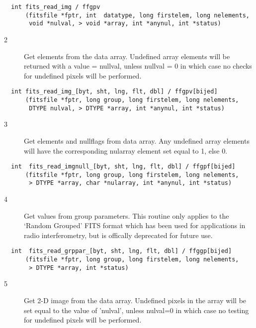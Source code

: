 \begin{verbatim}
  int fits_read_img / ffgpv
      (fitsfile *fptr, int  datatype, long firstelem, long nelements,
       void *nulval, > void *array, int *anynul, int *status)
\end{verbatim}

\begin{description}
\item[2 ] Get elements from the data array.  Undefined array elements will be
    returned with a value = nullval, unless nullval = 0 in which case no
   checks for undefined pixels will be performed.
\end{description}

\begin{verbatim}
  int fits_read_img_[byt, sht, lng, flt, dbl] / ffgpv[bijed]
      (fitsfile *fptr, long group, long firstelem, long nelements,
       DTYPE nulval, > DTYPE *array, int *anynul, int *status)
\end{verbatim}

\begin{description}
\item[3 ] Get elements and nullflags from data array.
    Any undefined array elements will have the corresponding nularray element
   set equal to 1, else 0.
\end{description}

\begin{verbatim}
  int  fits_read_imgnull_[byt, sht, lng, flt, dbl] / ffgpf[bijed]
      (fitsfile *fptr, long group, long firstelem, long nelements,
       > DTYPE *array, char *nularray, int *anynul, int *status)
\end{verbatim}

\begin{description}
\item[4 ] Get values from group parameters.  This routine only applies
    to the `Random Grouped' FITS format which has been used for
    applications in radio interferometry, but is offically deprecated
   for future use.
\end{description}

\begin{verbatim}
  int  fits_read_grppar_[byt, sht, lng, flt, dbl] / ffggp[bijed]
      (fitsfile *fptr, long group, long firstelem, long nelements,
       > DTYPE *array, int *status)
\end{verbatim}

\begin{description}
\item[5 ]  Get 2-D image from the data array.  Undefined
     pixels in the array will be set equal to the value of 'nulval',
     unless nulval=0 in which case no testing for undefined pixels will
    be performed.
\end{description}

